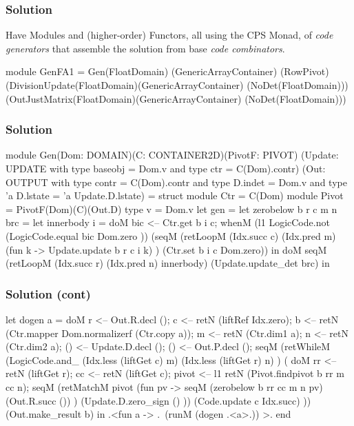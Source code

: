 \documentclass{beamer}
\begin{document}
\begin{frame}[fragile]
    \frametitle{Solution}
    Have Modules and (higher-order) Functors, all using the CPS Monad, of
    \emph{code generators} that assemble the solution from base \emph{code
    combinators}.
\begin{code}
module GenFA1 = 
    Gen(FloatDomain)
       (GenericArrayContainer)
       (RowPivot)
       (DivisionUpdate(FloatDomain)(GenericArrayContainer)
                      (NoDet(FloatDomain)))
       (OutJustMatrix(FloatDomain)(GenericArrayContainer)
                     (NoDet(FloatDomain)))
\end{code}
\end{frame}

\begin{frame}[fragile]
    \frametitle{Solution}
\begin{code2}
module Gen(Dom: DOMAIN)(C: CONTAINER2D)(PivotF: PIVOT)
          (Update: UPDATE with type baseobj = Dom.v 
                          and type ctr = C(Dom).contr)
          (Out: OUTPUT with type contr = C(Dom).contr 
                       and type D.indet = Dom.v 
                       and type 'a D.lstate = 'a Update.D.lstate) =
   struct
    module Ctr = C(Dom) module Pivot = PivotF(Dom)(C)(Out.D)
    type v = Dom.v
    let gen =
      let zerobelow b r c m n brc = 
        let innerbody i = doM
            bic <-- Ctr.get b i c;
            whenM (l1 LogicCode.not (LogicCode.equal bic Dom.zero ))
                (seqM (retLoopM (Idx.succ c) (Idx.pred m)
                          (fun k -> Update.update b r c i k) )
                      (Ctr.set b i c Dom.zero)) in 
        doM seqM (retLoopM (Idx.succ r) (Idx.pred n) innerbody) 
                   (Update.update_det brc) in
\end{code2}
\end{frame}

\begin{frame}[fragile]
    \frametitle{Solution (cont)}
\begin{code2}
  let dogen a = doM
      r <-- Out.R.decl ();
      c <-- retN (liftRef Idx.zero);
      b <-- retN (Ctr.mapper Dom.normalizerf (Ctr.copy a));
      m <-- retN (Ctr.dim1 a);
      n <-- retN (Ctr.dim2 a);
      () <-- Update.D.decl ();
      () <-- Out.P.decl ();
      seqM 
        (retWhileM (LogicCode.and_ (Idx.less (liftGet c) m)
                                   (Idx.less (liftGet r) n) )
           ( doM
           rr <-- retN (liftGet r);
           cc <-- retN (liftGet c);
           pivot <-- l1 retN (Pivot.findpivot b rr m cc n);
           seqM (retMatchM pivot (fun pv -> 
                    seqM (zerobelow b rr cc m n pv) (Out.R.succ ()) )
                    (Update.D.zero_sign () ))
                (Code.update c Idx.succ) ))
        (Out.make_result b)
in .<fun a -> .~(runM (dogen .<a>.)) >.  end
\end{code2}
\end{frame}
\end{document}
